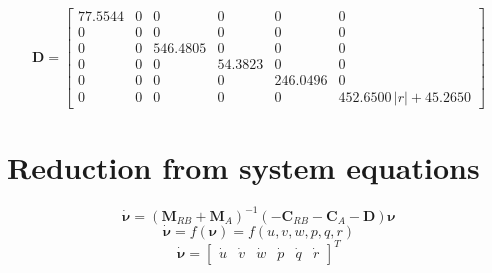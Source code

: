 \documentclass[12pt,a4]{article}
\begin{document}
\begin{equation*}
	\bm{D} = \left[\begin{array}{cccccc} 77.5544 & 0 & 0 & 0 & 0 & 0\\ 0 & 0 & 0 & 0 & 0 & 0\\ 0 & 0 & 546.4805 & 0 & 0 & 0\\ 0 & 0 & 0 & 54.3823 & 0 & 0\\ 0 & 0 & 0 & 0 & 246.0496 & 0\\ 0 & 0 & 0 & 0 & 0 & 452.6500\,\left|r\right|+45.2650 \end{array}\right]
\end{equation*}


\section{Reduction from system equations}
\begin{equation}
	\dot{\bm{\nu}} = (\bm{M}_{RB}+\bm{M}_{A})^{-1}(-\bm{C}_{RB}-\bm{C}_{A}-\bm{D})\bm{\nu}
\end{equation}
\begin{equation}
	\dot{\bm{\nu}} = f(\bm{\nu}) = f(u, v, w, p, q, r)
\end{equation}
\begin{equation}
	\dot{\bm{\nu}} = \begin{bmatrix}\dot{u}&\dot{v}&\dot{w}&\dot{p}&\dot{q}&\dot{r}\end{bmatrix}^T
\end{equation}
\end{document}
